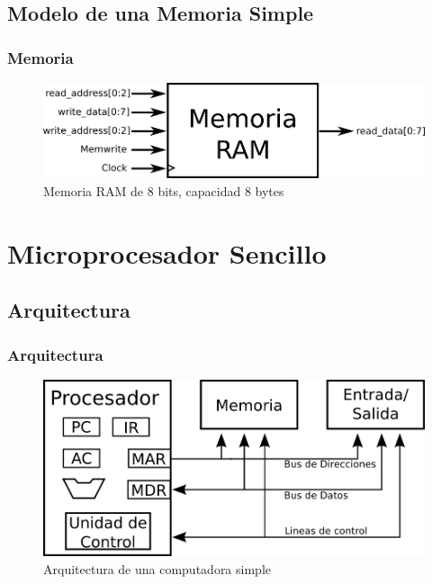 \documentclass{beamer}
\begin{document}
\subsection{Modelo de una Memoria Simple}
\begin{frame}
\frametitle{Memoria} 
\begin{figure}[h]
  \centering
    \includegraphics[width=.7\textwidth]{graficos/ram.png}
  \caption{Memoria RAM de 8 bits, capacidad 8 bytes}
\end{figure}
\end{frame}

\section{Microprocesador Sencillo}
\subsection{Arquitectura}
\begin{frame}
\frametitle{Arquitectura}  
\begin{figure}[h]
  \centering
    \includegraphics[width=.8\textwidth]{graficos/computadora.png}
  \caption{Arquitectura de una computadora simple}
\end{figure}
\end{frame}
\end{document}
